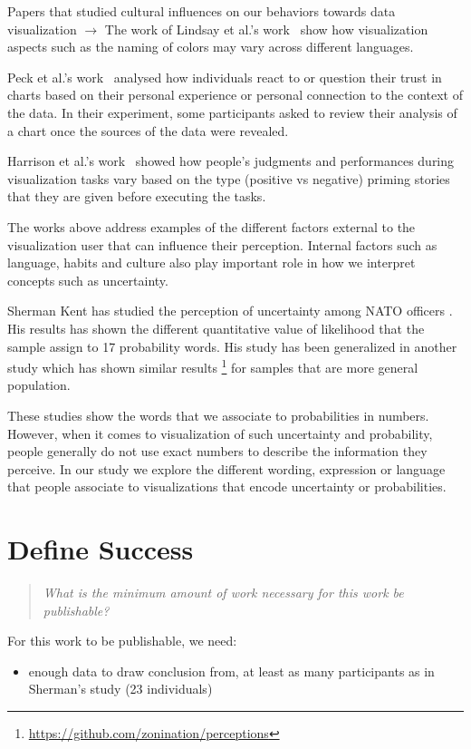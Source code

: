 \documentclass{proc}
\begin{document}
Papers that studied cultural influences on our behaviors towards data visualization $\rightarrow$ 
The work of Lindsay et al.'s work~\cite{lindsey2009world} show how visualization aspects such as the naming of colors may vary across different languages. 

Peck et al.'s work~\cite{peck2019data} analysed how individuals react to or question their trust in charts based on their personal experience or personal connection to the context of the data. In their experiment, some participants asked to review their analysis of a chart once the sources of the data were revealed.

Harrison et al.'s work~\cite{harrison2012exploring} showed how people's judgments and performances during visualization tasks vary based on the type (positive vs negative) priming stories that they are given before executing the tasks. 

The works above address examples of the different factors external to the visualization user that can influence their perception. Internal factors such as language, habits and culture also play important role in how we interpret concepts such as uncertainty. 

Sherman Kent has studied the perception of uncertainty among NATO officers \cite{desjardins2017measuring}. His results has shown the different quantitative value of likelihood that the sample assign to 17 probability words. His study has been generalized in another study which has shown similar results \footnote{\url{https://github.com/zonination/perceptions}} for samples that are more general population. 

These studies show the words that we associate to probabilities in numbers.
However, when it comes to visualization of such uncertainty and probability, people generally do not use exact numbers to describe the information they perceive. In our study we explore the different wording, expression or language that people associate to visualizations that encode uncertainty or probabilities. 


\section{Define Success}
\begin{quote}
\textit{What is the minimum amount of work necessary for this work be publishable?}
\end{quote}
For this work to be publishable, we need: 
\begin{itemize}
    \item enough data to draw conclusion from, at least as many participants as in Sherman's study (23 individuals)
\end{itemize}



\end{document}
